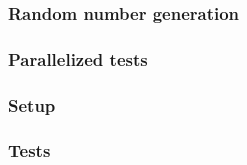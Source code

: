 
\subsubsection*{Random number generation}


\subsubsection*{Parallelized tests}

\subsubsection*{Setup}
\subsubsection*{Tests}
